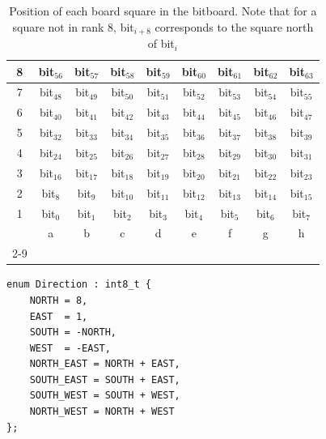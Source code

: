 \documentclass[12pt,a4paper,twoside,openright]{book}
\begin{document}
\begin{table}[htpb]
\centering
\caption{Position of each board square in the bitboard. Note that for a square not in rank 8, bit$_{i+8}$ corresponds to the square north of bit$_i$}
\label{tab:bitboard_indices2}
\begin{tabular}{|c|c|c|c|c|c|c|c|c|}
\hline
8 & bit$_{56}$ & bit$_{57}$ & bit$_{58}$ & bit$_{59}$ & bit$_{60}$ & bit$_{61}$ & bit$_{62}$ & bit$_{63}$ \\ \hline
7 & bit$_{48}$ & bit$_{49}$ & bit$_{50}$ & bit$_{51}$ & bit$_{52}$ & bit$_{53}$ & bit$_{54}$ & bit$_{55}$ \\ \hline
6 & bit$_{40}$ & bit$_{41}$ & bit$_{42}$ & bit$_{43}$ & bit$_{44}$ & bit$_{45}$ & bit$_{46}$ & bit$_{47}$ \\ \hline
5 & bit$_{32}$ & bit$_{33}$ & bit$_{34}$ & bit$_{35}$ & bit$_{36}$ & bit$_{37}$ & bit$_{38}$ & bit$_{39}$ \\ \hline
4 & bit$_{24}$ & bit$_{25}$ & bit$_{26}$ & bit$_{27}$ & bit$_{28}$ & bit$_{29}$ & bit$_{30}$ & bit$_{31}$ \\ \hline
3 & bit$_{16}$ & bit$_{17}$ & bit$_{18}$ & bit$_{19}$ & bit$_{20}$ & bit$_{21}$ & bit$_{22}$ & bit$_{23}$ \\ \hline
2 & bit$_{8}$ & bit$_{9}$ & bit$_{10}$ & bit$_{11}$ & bit$_{12}$ & bit$_{13}$ & bit$_{14}$ & bit$_{15}$ \\ \hline
1 & bit$_{0}$ & bit$_{1}$ & bit$_{2}$ & bit$_{3}$ & bit$_{4}$ & bit$_{5}$ & bit$_{6}$ & bit$_{7}$ \\ \hline
\multicolumn{1}{c|}{} & a & b & c & d & e & f & g & h \\
\cline{2-9}
\end{tabular}
\end{table}

\begin{mdframed}[skipabove=\baselineskip,hidealllines=true]
\begin{verbatim}
enum Direction : int8_t {
    NORTH = 8,
    EAST  = 1,
    SOUTH = -NORTH,
    WEST  = -EAST,
    NORTH_EAST = NORTH + EAST,
    SOUTH_EAST = SOUTH + EAST,
    SOUTH_WEST = SOUTH + WEST,
    NORTH_WEST = NORTH + WEST
};
\end{verbatim}
\label{lst:directions}
\end{mdframed}
\end{document}
